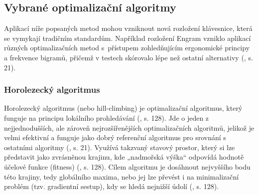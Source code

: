 \documentclass[a4paper, twoside, 12pt, czech]{article}
\begin{document}






\subsection{Vybrané optimalizační algoritmy}
Aplikací níže popsaných metod mohou vzniknout nová rozložení klávesnice, která se vymykají 
tradičním standardům. Například rozložení Engram vzniklo aplikací různých optimalizačních metod 
s~přístupem zohledňujícím ergonomické principy a frekvence bigramů, přičemž v testech
skórovalo lépe než ostatní alternativy (\cite{engramapproach}, s. 21).
\subsubsection{Horolezecký algoritmus}
Horolezecký algoritmus (nebo hill-climbing) je optimalizační algoritmus, kte\-rý 
funguje na principu lokálního prohledávání (\cite{aiModernApproach}, s. 128). 
Jde o jeden z nejjedno\-dušších, ale zároveň nejrozšířenějších optimalizačních 
algoritmů, jelikož je velmi efektivní a funguje jako dobrý referenční algoritmus 
pro srovnání s ostatními algoritmy (\cite{evolutionaryOptimizationAlgos}, s. 21).
Využívá takzvaný stavový prostor, který si lze představit jako zvrásněnou krajinu, 
kde „nadmořská výška“ odpovídá hodnotě účelové funkce (fitness) (\cite{aiModernApproach}, s. 128).
Cílem algoritmu je dosáhnout nejvyššího bodu této krajiny, tedy globálního maxima, nebo 
jej lze převést i na minimalizační problém (tzv. gradientní sestup), 
kdy se hledá nejnižší údolí (\cite{aiModernApproach}, s. 128).
\end{document}
